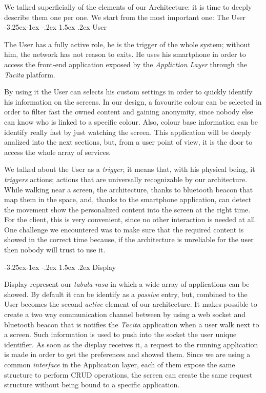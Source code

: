 \documentclass[]{usiinfbachelorproject}
\makeatletter
\newcommand\subsubsection{\@startsection{subsubsection}{3}{\z@}%
                {-3.25ex\@plus -1ex \@minus -.2ex}%
                {1.5ex \@plus .2ex}%
                {\normalfont\normalsize\bfseries}}
\makeatother
\begin{document}
We talked superficially of the elements of our Architecture: it is time to deeply describe them one per one. We start from the most important one: The User  
\subsubsection{User}

The User has a fully active role, he is the trigger of the whole system; without him, the network has not reason to exits. He uses his smartphone in order to access the front-end application exposed by the \emph{Appliction Layer} through the \emph{Tacita} platform.

By using it the User can selects his custom settings in order to quickly identify his information on the screens.
In our design, a favourite colour can be selected in order to filter fast the owned content and gaining anonymity, since nobody else can know who is linked to a specific colour. Also, colour base information can be identify really fast by just watching the screen.
This application will be deeply analized into the next sections, but, from a user point of view, it is the door to access the whole array of services.

We talked about the User as a \emph{trigger}, it means that, with his physical being, it \emph{triggers} actions; actions that are universally recognizable by our architecture. While walking near a screen, the architecture, thanks to bluetooth beacon that map them in the space, and, thanks to the smartphone application, can detect the movement show the personalized content into the screen at the right time. For the client, this is very convenient, since no other interaction is needed at all. One challenge we encountered was to make sure that the required content is showed in the correct time because, if the architecture is unreliable for the user then nobody will trust to use it.
 
\subsubsection{Display}

Display represent our \emph{tabula rasa} in which a wide array of applications can be showed. By default it can be identify as a \emph{passive} entry, but, combined to the User becomes the second \emph{active} element of our architecture. It makes possible to create a two way communication channel between by using a web socket and bluetooth beacon that is notifies the \emph{Tacita} application when a user walk next to a screen. Such information is used to push into the socket the user unique identifier. As soon as the display receives it, a request to the running application is made in order to get the preferences and showed them. Since we are using a common \emph{interface} in the Application layer, each of them expose the same structure to perform CRUD operations, the screen can create the same request structure without being bound to a specific application.
\end{document}
